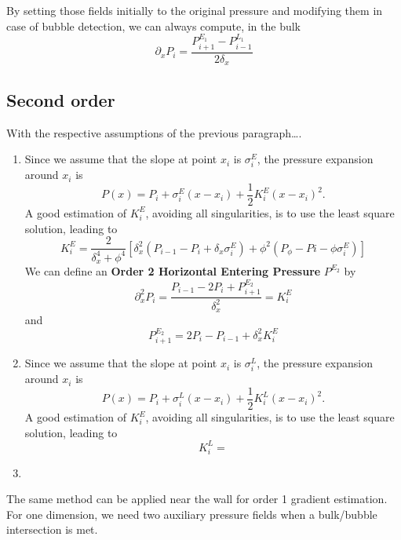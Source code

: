 \documentclass[aps]{revtex4}
\begin{document}
By setting those fields initially to the original pressure and modifying them in case of bubble detection,
we can always compute, in the bulk
$$
	\partial_x P_i = \dfrac{P^{E_1}_{i+1} - P^{L_1}_{i-1}}{2\delta_x}
$$

\subsection{Second order}
With the respective assumptions of the previous paragraph….
\begin{enumerate}

\item Since we assume that the slope at point $x_i$ is $\sigma_i^E$, the pressure expansion around $x_i$ 
is
$$
	P(x) = P_i + \sigma_i^E \left(x-x_i\right) + \frac{1}{2} K_i^E \left(x-x_i\right)^2.
$$
A good estimation of $K_i^E$, avoiding all singularities, is to use the least square solution,
leading to
$$
	K_i^E = \dfrac{2}{\delta_x^4+\phi^4}
	\left\lbrack
		\delta_x^2\left(P_{i-1}-P_{i} + \delta_x \sigma_i^E\right) + \phi^2\left(P_\phi - Pi - \phi\sigma_i^E\right)
	\right\rbrack
$$
We can define an \textbf{Order 2 Horizontal Entering Pressure} $P^{E_2}$ by
$$
	\partial_x^2 P_i = \dfrac{P_{i-1}-2P_i + P^{E_2}_{i+1}}{\delta_x^2} = K_i^E
$$
and
$$
	P^{E_2}_{i+1} = 2P_i - P_{i-1} + \delta_x^2 K_i^E
$$
\item
Since we assume that the slope at point $x_i$ is $\sigma_i^L$, the pressure expansion around $x_i$ 
is
$$
	P(x) = P_i + \sigma_i^L \left(x-x_i\right) + \frac{1}{2} K_i^L \left(x-x_i\right)^2.
$$
A good estimation of $K_i^E$, avoiding all singularities, is to use the least square solution,
leading to
$$
	K_i^L = 
$$

\item

\end{enumerate}

The same method can be applied near the wall for order 1 gradient estimation.\\
For one dimension, we need two auxiliary pressure fields when a bulk/bubble intersection is met.
\end{document}
